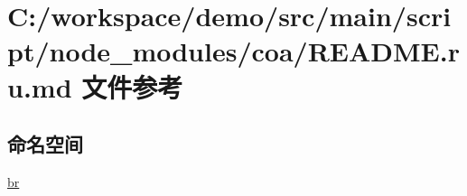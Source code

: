 \hypertarget{coa_2_r_e_a_d_m_e_8ru_8md}{}\section{C\+:/workspace/demo/src/main/script/node\+\_\+modules/coa/\+R\+E\+A\+D\+ME.ru.\+md 文件参考}
\label{coa_2_r_e_a_d_m_e_8ru_8md}
\subsection*{命名空间}
\begin{DoxyCompactItemize}
\item 
 \mbox{\hyperlink{namespacebr}{br}}
\end{DoxyCompactItemize}
